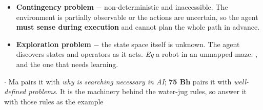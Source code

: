 {\begin{itemize}
        knows the rules but not its exact state, so it reasons over a \emph{set} of
        possible states. \emph{Eg} walking across a dark room. It may have no sensors at
        all.
  \item \textbf{Contingency problem} $-$ non-deterministic and inaccessible. The
        environment is partially observable or the actions are uncertain, so the agent
        \textbf{must sense during execution} and cannot plan the whole path in advance.
  \item \textbf{Exploration problem} $-$ the state space itself is unknown. The agent
        discovers states and operators as it acts. \emph{Eg} a robot in an unmapped maze.
        , and the one that needs learning.
\end{itemize}}


{\color{sub}\footnotesize {}  \gap$\cdot$ Ma pairs it with \emph{why is searching necessary in AI}; \textbf{75 Bh} pairs it with
\emph{well-defined problems}. It is the machinery behind the water-jug rules, so answer it
with those rules as the example}

